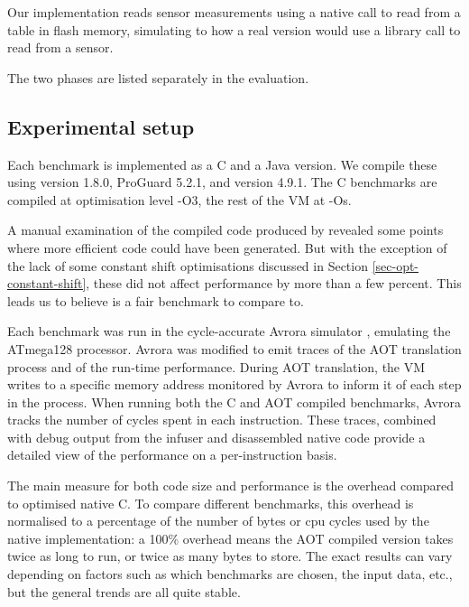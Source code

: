Our implementation reads sensor measurements using a native call to read from a table in flash memory, simulating to how a real version would use a library call to read from a sensor.

The two phases are listed separately in the evaluation.


\subsection{Experimental setup}
Each benchmark is implemented as a C and a Java version. We compile these using  version 1.8.0, ProGuard 5.2.1, and  version 4.9.1. The C benchmarks are compiled at optimisation level -O3, the rest of the VM at -Os.

A manual examination of the compiled code produced by  revealed some points where more efficient code could have been generated. But with the exception of the lack of some constant shift optimisations discussed in Section \ref{sec-opt-constant-shift}, these did not affect performance by more than a few percent. This leads us to believe  is a fair benchmark to compare to.

Each benchmark was run in the cycle-accurate Avrora simulator \cite{Titzer:2005vb}, emulating the ATmega128 processor. Avrora was modified to emit traces of the AOT translation process and of the run-time performance. During AOT translation, the VM writes to a specific memory address monitored by Avrora to inform it of each step in the process. When running both the C and AOT compiled benchmarks, Avrora tracks the number of cycles spent in each instruction. These traces, combined with debug output from the infuser and disassembled native code provide a detailed view of the performance on a per-instruction basis.

The main measure for both code size and performance is the overhead compared to optimised native C. To compare different benchmarks, this overhead is normalised to a percentage of the number of bytes or cpu cycles used by the native implementation: a 100\% overhead means the AOT compiled version takes twice as long to run, or twice as many bytes to store. The exact results can vary depending on factors such as which benchmarks are chosen, the input data, etc., but the general trends are all quite stable.

